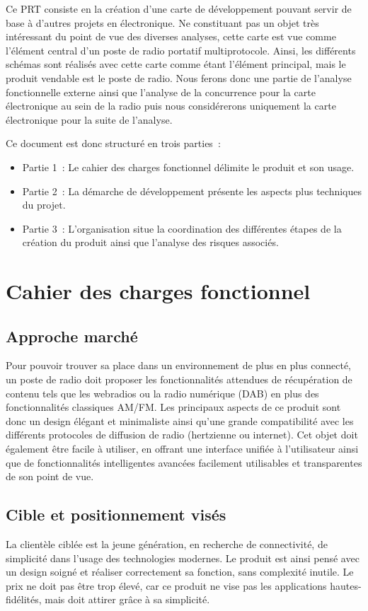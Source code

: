 	Ce PRT consiste en la création d'une carte de développement pouvant servir de base à d'autres projets en électronique.
    Ne constituant pas un objet très intéressant du point de vue des diverses analyses, cette carte est vue comme l'élément central d'un poste de radio portatif multiprotocole.
     Ainsi, les différents schémas sont réalisés avec cette carte comme étant l'élément principal, mais le produit vendable est le poste de radio.
     Nous ferons donc une partie de l'analyse fonctionnelle externe ainsi que l'analyse de la concurrence pour la carte électronique au sein de la radio puis nous considérerons uniquement la carte électronique pour la suite de l'analyse.
     
     Ce document est donc structuré en trois parties~:
    \begin{itemize}
	    \item Partie 1~: Le cahier des charges fonctionnel délimite le produit et son usage.
        \item Partie 2~: La démarche de développement présente les aspects plus techniques du projet.
        \item Partie 3~: L'organisation situe la coordination des différentes étapes de la création du produit ainsi que l'analyse des risques associés.
    \end{itemize}
    
\section{Cahier des charges fonctionnel}
	\subsection{Approche marché}
    	Pour pouvoir trouver sa place dans un environnement de plus en plus connecté, un poste de radio doit proposer les fonctionnalités attendues de récupération de contenu tels que les webradios ou la radio numérique (DAB) en plus des fonctionnalités classiques AM/FM.
        Les principaux aspects de ce produit sont donc un design élégant et minimaliste ainsi qu'une grande compatibilité avec les différents protocoles de diffusion de radio (hertzienne ou internet).
        Cet objet doit également être facile à utiliser, en offrant une interface unifiée à l'utilisateur ainsi que de fonctionnalités intelligentes avancées facilement utilisables et transparentes de son point de vue.
        
    \subsection{Cible et positionnement visés}
    	La clientèle ciblée est la jeune génération, en recherche de connectivité, de simplicité dans l'usage des technologies modernes.
        Le produit est ainsi pensé avec un design soigné et réaliser correctement sa fonction, sans complexité inutile.
        Le prix ne doit pas être trop élevé, car ce produit ne vise pas les applications hautes-fidélités, mais doit attirer grâce à sa simplicité.
        
